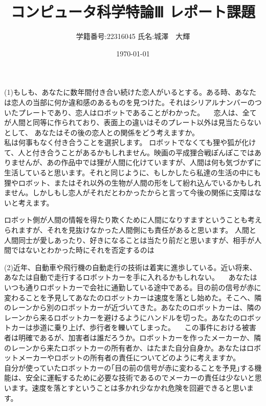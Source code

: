 \documentclass[11pt,a4paper]{jsarticle}
\title{コンピュータ科学特論Ⅲ レポート課題}
\author{学籍番号:22316045 
氏名:城澤　大輝}
\date{\today}
\begin{document}
\maketitle
%
%

(1)もしも、あなたに数年間付き合い続けた恋人がいるとする。ある時、あなたは恋人の当部に何か違和感のあるものを見つけた。それはシリアルナンバーのついたプレートであり、恋人はロボットであることがわかった。
　恋人は、全てが人間と同等に作られており、表面上の違いはそのプレート以外は見当たらないとして、
あなたはその後の恋人との関係をどう考えますか。\\


私は何事もなく付き合うことを選択します。
ロボットでなくても狸や狐が化けて、人と付き合うことがあるかもしれません。映画の平成狸合戦ぽんぽこではありませんが、あの作品中では狸が人間に化けていますが、人間は何も気づかずに生活していると思います。それと同じように、もしかしたら私達の生活の中にも狸やロボット、またはそれ以外の生物が人間の形をして紛れ込んでいるかもしれません。しかしもし恋人がそれだとわかったからと言って今後の関係に支障はないと考えます。

ロボット側が人間の情報を得たり欺くために人間になりすますということも考えられますが、それを見抜けなかった人間側にも責任があると思います。
人間と人間同士が愛しあったり、好きになることは当たり前だと思いますが、相手が人間ではないとわかった時にそれを否定するのは 


\newpage

(2)近年、自動車や飛行機の自動走行の技術は着実に進歩している。近い将来、あなたは自動で走行するロボットカーを手に入れるかもしれない。
　あなたはいつも通りロボットカーで会社に通勤している途中である。目の前の信号が赤に変わることを予見してあなたのロボットカーは速度を落とし始めた。そこへ、隣のレーンから別のロボットカーが近づいてきた。あなたのロボットカーは、隣のレーンから来るロボットカーを避けるようにハンドルを切った。あなたのロボットカーは歩道に乗り上げ、歩行者を轢いてしまった。
　この事件における被害者は明確であるが、加害者は誰だろうか。ロボットカーを作ったメーカーか、隣のレーンから来たロボットカーの所有者か、はたまた自分自身か。あなたはロボットメーカーやロボットの所有者の責任についてどのように考えますか。\\
 
自分が使っていたロボットカーの｢目の前の信号が赤に変わることを予見｣する機能は、安全に運転するために必要な技術であるのでメーカーの責任は少ないと思います。速度を落とすということは多かれ少なかれ危険を回避できると思います。
\end{document}
